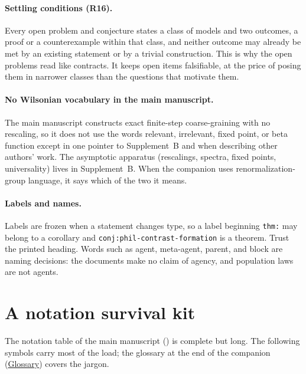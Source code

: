 \paragraph{Settling conditions (R16).}
Every open problem and conjecture states a class of models and two outcomes, a proof or a
counterexample within that class, and neither outcome may already be met by an existing statement or
by a trivial construction. This is why the open problems read like contracts. It keeps open items
falsifiable, at the price of posing them in narrower classes than the questions that motivate them.

\paragraph{No Wilsonian vocabulary in the main manuscript.}
The main manuscript constructs exact finite-step coarse-graining with no rescaling, so it does not
use the words relevant, irrelevant, fixed point, or beta function except in one pointer to
Supplement~B and when describing other authors' work. The asymptotic apparatus (rescalings, spectra, fixed points, universality) lives in
Supplement~B. When the companion uses renormalization-group language, it says which of the two it
means.

\paragraph{Labels and names.}
Labels are frozen when a statement changes type, so a label beginning \texttt{thm:} may belong to a
corollary and \texttt{conj:phil-contrast-formation} is a theorem. Trust the printed heading. Words
such as agent, meta-agent, parent, and block are naming decisions: the documents make no claim of
agency, and population laws are not agents.

\section*{A notation survival kit}

The notation table of the main manuscript () is complete but long. The
following symbols carry most of the load; the glossary at the end of the companion
(\hyperref[comp:glossary]{Glossary}) covers the jargon.

